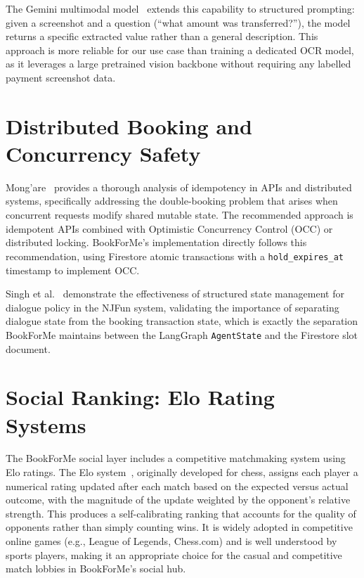 The Gemini multimodal model~\cite{team2023gemini} extends this capability to
structured prompting: given a screenshot and a question (``what amount was
transferred?''), the model returns a specific extracted value rather than a
general description. This approach is more reliable for our use case than
training a dedicated OCR model, as it leverages a large pretrained vision
backbone without requiring any labelled payment screenshot data.

\section{Distributed Booking and Concurrency Safety}
\label{sec:lit-concurrency}

Mong'are~\cite{mongare2024} provides a thorough analysis of idempotency in
APIs and distributed systems, specifically addressing the double-booking
problem that arises when concurrent requests modify shared mutable state. The
recommended approach is idempotent APIs combined with Optimistic Concurrency
Control (OCC) or distributed locking. BookForMe's implementation directly
follows this recommendation, using Firestore atomic transactions with a
\texttt{hold\_expires\_at} timestamp to implement OCC.

Singh et al.~\cite{singh2000} demonstrate the effectiveness of structured
state management for dialogue policy in the NJFun system, validating the
importance of separating dialogue state from the booking transaction state,
which is exactly the separation BookForMe maintains between the LangGraph
\texttt{AgentState} and the Firestore slot document.

\section{Social Ranking: Elo Rating Systems}
\label{sec:lit-elo}

The BookForMe social layer includes a competitive matchmaking system using Elo
ratings. The Elo system~\cite{elo1978}, originally developed for chess, assigns
each player a numerical rating updated after each match based on the expected
versus actual outcome, with the magnitude of the update weighted by the
opponent's relative strength. This produces a self-calibrating ranking that
accounts for the quality of opponents rather than simply counting wins. It is
widely adopted in competitive online games (e.g., League of Legends, Chess.com)
and is well understood by sports players, making it an appropriate choice for
the casual and competitive match lobbies in BookForMe's social hub.

